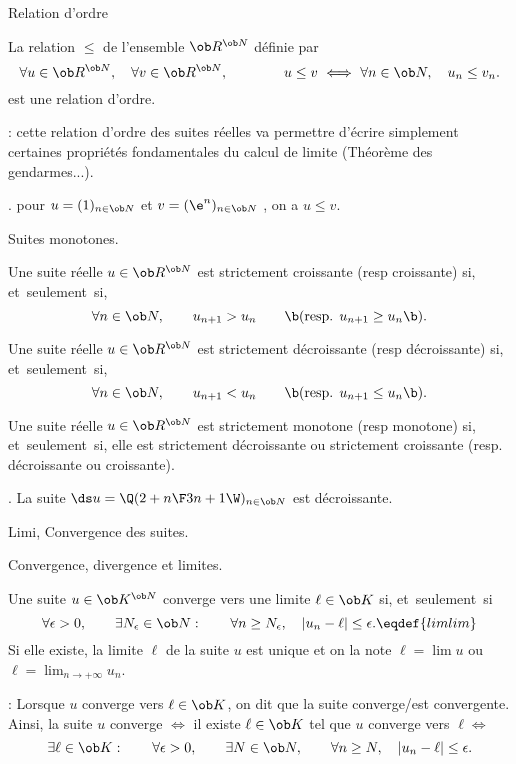 \Concept [] Relation d'ordre

\Definition []  La relation $\le$ de l'ensemble $\ob R^{\ob N}$ définie par 
$$
\forall u\in\ob R^{\ob N}, \quad\forall v\in\ob R^{\ob N}, \qquad\qquad u\le v\ \Longleftrightarrow \ \forall
n\in\ob N, \quad u_n\le v_n.  
$$
est une relation d'ordre. \bigskip

\Remarque : cette relation d'ordre des suites réelles va permettre d'écrire simplement certaines propriétés fondamentales du calcul de limite (Théorème des gendarmes...). 
\bigskip

\Exemple. pour $u=(1)_{n\in\ob N}$ et $v=(\e^n)_{n\in\ob N}$ , on a $u\le v$. 
\bigskip

\Concept [] Suites monotones.

\Definition []  Une suite réelle $u\in\ob R^{\ob N}$ est strictement croissante (resp croissante) si, et~seulement~si,
$$
\forall n\in\ob N, \qquad {u_{n+1}> u_n}\qquad\b(\mbox{resp. }{u_{n+1}\ge u_n}\b).
$$

\Definition []  Une suite réelle $u\in\ob R^{\ob N}$ est strictement décroissante (resp décroissante) si, et~seulement~si,
$$
\forall n\in\ob N, \qquad {u_{n+1}< u_n}\qquad\b(\mbox{resp. }{u_{n+1}\le u_n}\b).
$$

\Definition []  Une suite réelle $u\in\ob R^{\ob N}$ est strictement monotone (resp monotone) si, et~seulement~si,
elle est strictement décroissante ou strictement croissante (resp. décroissante ou croissante). 
\bigskip

{}
\bigskip

\Exemple. La suite $\ds u=\Q({2+n\F 3n+1}\W)_{n\in\ob N}$ est décroissante. 
\bigskip

\Section Limi, Convergence des suites. 

\Subsection Convergence, divergence et limites. 

\Definition []  Une suite $u\in\ob K^{\ob N}$ converge vers une limite $\ell\in\ob K$ si, et~seulement~si
$$
\forall\epsilon>0, \qquad \exists N_\epsilon\in\ob N:\qquad \forall n\ge N_\epsilon, \quad |u_n-\ell|\le \epsilon.\eqdef{limlim}
$$
Si elle existe, la limite $\ell$ de la suite $u$ est unique et on la note $\ell=\lim u$ ou $\ell=\lim_{n\to+\infty}u_n$. 
\bigskip

\Remarque : Lorsque $u$ converge vers $\ell\in\ob K$, on dit que la suite converge/est convergente. 
Ainsi, la suite $u$ converge $\Leftrightarrow$ il existe $\ell\in\ob K$ tel que $u$ converge vers $\ell\Leftrightarrow$
$$
\exists \ell\in\ob K:\qquad \forall\epsilon>0, \qquad \exists N\in\ob N,\qquad \forall n\ge N, \quad |u_n-\ell|\le \epsilon.
$$

